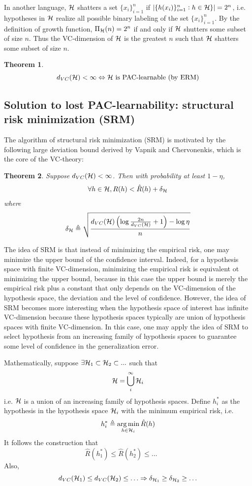 \documentclass{article}
\DeclareMathOperator*{\argmin}{arg\,min}
\newtheorem{theorem}{Theorem}
\begin{document}
In another language, ${\mathcal H}$ shatters a set $\{x_i\}_{i = 1}^n$ if $|\{h(x_i)\}_{i = 1}^n : h \in {\mathcal H}\}| = 2^n$, i.e. hypotheses in ${\mathcal H}$ realize all possible binary labeling of the set $\{x_i\}_{i = 1}^n$.
By the definition of growth function, $\Pi_{\mathcal H} (n) = 2^n$ if and only if ${\mathcal H}$ shutters some subset of size $n$.
Thus the VC-dimension of ${\mathcal H}$ is the greatest $n$ such that ${\mathcal H}$ shatters some subset of size $n$.

\begin{theorem}
\[
d_{VC} ({\mathcal H}) < \infty
\Leftrightarrow {\mathcal H}\ \text{is PAC-learnable (by ERM)}
\]
\end{theorem}

\subsection{Solution to lost PAC-learnability: structural risk minimization (SRM) \cite{vapnik1992principles}}

The algorithm of structural risk minimization (SRM) is motivated by the following large deviation bound derived by Vapnik and Chervonenkis, which is the core of the VC-theory:
\begin{theorem}
Suppose $d_{VC} ({\mathcal H}) < \infty$.
Then with probability at least $1 - \eta$,
\[
\forall h \in {\mathcal H}, R (h) < \hat{R} (h) + \delta_{\mathcal H}
\]
where
\[
\delta_{\mathcal H} \triangleq \sqrt{\frac{d_{VC} ({\mathcal H}) \left(\log \frac{2 n}{d_{VC} ({\mathcal H})} + 1\right) - \log \eta}{n}}
\]
\end{theorem}
The idea of SRM is that instead of minimizing the empirical risk, one may minimize the upper bound of the confidence interval.
Indeed, for a hypothesis space with finite VC-dimension, minimizing the empirical risk is equivalent ot minimizing the upper bound, because in this case the upper bound is merely the empirical risk plus a constant that only depends on the VC-dimension of the hypothesis space, the deviation and the level of confidence.
However, the idea of SRM becomes more interesting when the hypothesis space of interest has infinite VC-dimension because these hypothesis spaces typically are union of hypothesis spaces with finite VC-dimension.
In this case, one may apply the idea of SRM to select hypothesis from an increasing family of hypothesis spaces to guarantee some level of confidence in the generalization error.

Mathematically, suppose $\exists {\mathcal H}_1 \subset {\mathcal H}_2 \subset ...$ such that
\[
{\mathcal H} = \bigcup_i^\infty {\mathcal H}_i
\]
i.e. ${\mathcal H}$ is a union of an increasing family of hypothesis spaces.
Define $h_i^*$ as the hypothesis in the hypothesis space ${\mathcal H}_i$ with the minimum empirical risk, i.e.
\[
h_i^* \triangleq \argmin_{h \in \calh_i} \hat{R} (h)
\]
It follows the construction that
\[
\hat{R} (h_1^*) \leq \hat{R} (h_2^*) \leq \ldots \qquad
\]
Also,
\[
d_{VC} ({\mathcal H}_1) \leq d_{VC} ({\mathcal H}_2) \leq \ldots
\Rightarrow \delta_{{\mathcal H}_1} \geq \delta_{{\mathcal H}_2} \geq \ldots
\]
\end{document}
